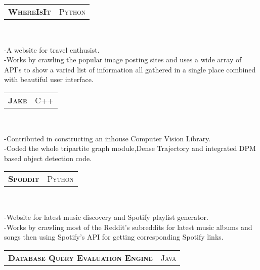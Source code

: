 \documentclass[10pt,a4paper,oneside]{article}
\begin{document}
    \begin{tabular}{c|c}
        \textbf{\normalsize W\textsc{here}I\textsc{s}I\textsc{t}}
        &\textmd{\normalsize P\textsc{ython}}
    \end{tabular}\\
     \vspace{-4mm}
    \begin{adjustwidth}{7pt}{0pt}
        {\footnotesize -A website for travel
        enthusist.\\
        -Works by crawling the popular image posting sites and
        uses a wide array of API's to show a varied list of
        information all gathered in a single place combined with
        beautiful user interface. }\\
    \end{adjustwidth}
    \begin{tabular}{c|c}
        \textbf{\normalsize J\textsc{ake}}
        &\textmd{\normalsize C\textsc{++}}
    \end{tabular}\\
     \vspace{-4mm}
    \begin{adjustwidth}{7pt}{0pt}
        {\footnotesize -Contributed in constructing an inhouse
        Computer Vision Library.\\
        -Coded the whole tripartite graph module,Dense
        Trajectory and integrated DPM based object detection code.}\\
    \end{adjustwidth}
    \begin{tabular}{c|c}
        \textbf{\normalsize S\textsc{poddit}}
        &\textmd{\normalsize P\textsc{ython}}
    \end{tabular}\\
     \vspace{-4mm}
    \begin{adjustwidth}{7pt}{0pt}
        {\footnotesize -Website for latest music
        discovery and Spotify playlist generator.\\
        -Works by crawling most of the Reddit's subreddits for
        latest music albums and songs then using Spotify's API for
        getting corresponding Spotify links.}\\
    \end{adjustwidth}
    \begin{tabular}{c|c}
        \textbf{\normalsize D\textsc{atabase} Q\textsc{uery}
        E\textsc{valuation} E\textsc{ngine}}
        &\textmd{\normalsize J\textsc{ava}}
    \end{tabular}\\
\end{document}
